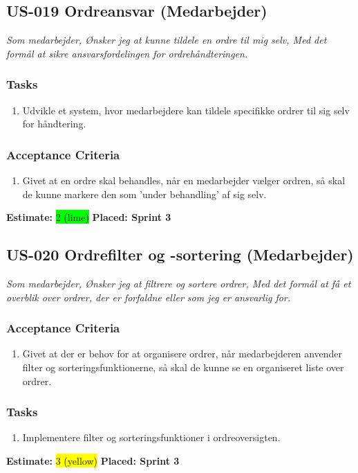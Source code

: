 \subsection{US-019 Ordreansvar (Medarbejder)}
\label{sec:US-019}
\textit{Som medarbejder, Ønsker jeg at kunne tildele en ordre til mig selv, Med det formål at sikre ansvarsfordelingen for ordrehåndteringen.}
\subsubsection*{\textbf{Tasks}}
\begin{enumerate}
  \item Udvikle et system, hvor medarbejdere kan tildele specifikke ordrer til sig selv for håndtering.
\end{enumerate}
\subsubsection*{\textbf{Acceptance Criteria}}
\begin{enumerate}
  \item Givet at en ordre skal behandles, når en medarbejder vælger ordren, så skal de kunne markere den som 'under behandling' af sig selv.
\end{enumerate}
\textbf{Estimate:} \colorbox{lime}{2 (lime)}
\textbf{Placed: Sprint 3}
\par\noindent\dotfill

\subsection{US-020 Ordrefilter og -sortering (Medarbejder)}
\label{sec:US-020}
\textit{Som medarbejder, Ønsker jeg at filtrere og sortere ordrer, Med det formål at få et overblik over ordrer, der er forfaldne eller som jeg er ansvarlig for.}
\subsubsection*{\textbf{Acceptance Criteria}}
\begin{enumerate}
  \item Givet at der er behov for at organisere ordrer, når medarbejderen anvender filter og sorteringsfunktionerne, så skal de kunne se en organiseret liste over ordrer.
\end{enumerate}
\subsubsection*{\textbf{Tasks}}
\begin{enumerate}
  \item Implementere filter og sorteringsfunktioner i ordreoversigten.
\end{enumerate}
\textbf{Estimate:} \colorbox{yellow}{3 (yellow)}
\textbf{Placed: Sprint 3}
\par\noindent\dotfill

